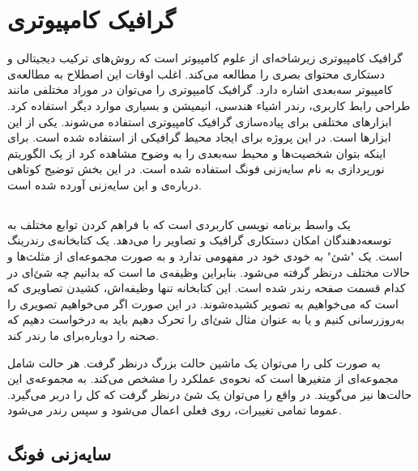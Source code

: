 \section{گرافیک کامپیوتری}

گرافیک کامپیوتری زیرشاخه‌ای از علوم کامپیوتر است که روش‌های 
ترکیب دیجیتالی و دستکاری محتوای بصری 
را مطالعه می‌کند.
اغلب اوقات این اصطلاح به مطالعه‌ی 
کامپیوتر سه‌بعدی اشاره دارد.
\cite{ComputerGraphicsWikipedia}
گرافیک کامیپوتری را می‌توان در 
موراد مختلفی مانند طراحی رابط کاربری،
رندر اشیاء هندسی، انیمیشن و بسیاری 
موارد دیگر استفاده کرد.
ابزارهای مختلفی برای پیاده‌سازی گرافیک کامپیوتری استفاده می‌شوند.
یکی از این ابزار‌ها 
است.
در این پروژه برای ایجاد محیط گرافیکی از 
استفاده شده است.
برای اینکه بتوان شخصیت‌ها و محیط سه‌بعدی را به وضوح مشاهده کرد از یک الگوریتم نورپردازی به نام 
سایه‌زنی فونگ استفاده شده است.
در این بخش توضیح کوتاهی دربا‌ره‌ی
 و
این سایه‌زنی آورده شده است.

\subsection {
    }

یک واسط برنامه نویسی کاربردی  
است که با فراهم کردن توابع مختلف به توسعه‌دهندگان امکان دستکاری گرافیک و تصاویر را می‌دهد.
یک کتابخانه‌ی رندرینگ است.
یک "شئ" به خودی خود در
مفهومی ندارد
و به صورت مجموعه‌ای از مثلث‌ها و حالات مختلف درنظر گرفته می‌شود. بنابراین  
وظیفه‌ی ما است که بدانیم چه شئ‌ای در کدام قسمت صفحه رندر شده است. این کتابخانه تنها وظیفه‌اش، کشیدن تصاویری که است که می‌خواهیم به تصویر کشیده‌شوند.
در این صورت اگر می‌خواهیم تصویری را به‌روزرسانی کنیم و یا به عنوان مثال شئ‌ای را تحرک دهیم باید به 
درخواست دهیم که صحنه را دوباره‌برای ما رندر کند.
\cite{KhronosUsingOpenGL}

به صورت کلی 
را می‌توان یک ماشین حالت بزرگ درنظر گرفت. هر حالت شامل مجموعه‌ای از متغیر‌ها است که نحوه‌ی عملکرد
را مشخص می‌کند. 
به مجموعه‌ی این حالت‌ها 
نیز می‌گویند. 
در واقع  
را می‌توان یک شئ درنظر گرفت که کل
را دربر می‌گیرد. عموما تمامی تغییرات، روی 
فعلی اعمال می‌شود و سپس رندر می‌شود.
\cite{KhronosUsingOpenGL} \cite{LearnOpenGL_GettingStarted}


\subsection{سایه‌زنی فونگ}

